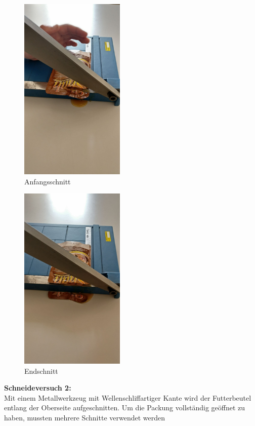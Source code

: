 \documentclass[a4paper,12pt]{scrartcl}
\begin{document}
\begin{figure}[H]
\begin{center}
\includegraphics[width=5cm]{Bilder/Schneideversuch_1.Art/Anfangsschnitt}
\caption{Anfangsschnitt}
\end{center}
\end{figure}

\begin{figure}[H]
\begin{center}
\includegraphics[width=5cm]{Bilder/Schneideversuch_1.Art/Endschnitt}
\caption{Endschnitt}
\end{center}
\end{figure}
\newpage
\textbf{Schneideversuch 2:}\\

Mit einem Metallwerkzeug mit Wellenschliffartiger Kante wird der Futterbeutel entlang der Oberseite aufgeschnitten. Um die Packung vollständig geöffnet zu haben, mussten mehrere Schnitte verwendet werden
\end{document}
